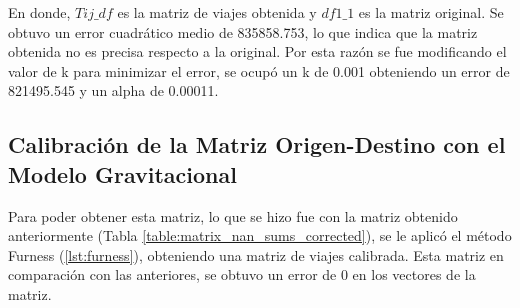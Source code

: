 \documentclass[letterpaper,12pt]{article}
\begin{document}
En donde, $Tij\_df$ es la matriz de viajes obtenida y $df1\_1$ es la matriz original. Se obtuvo un error cuadrático medio de 835858.753, lo que indica que la matriz obtenida no es precisa respecto a la original. Por esta razón se fue modificando el valor de k para minimizar el error, se ocupó un k de 0.001 obteniendo un error de 821495.545 y un alpha de 0.00011. 

\subsection{Calibración de la Matriz Origen-Destino con el Modelo Gravitacional}

Para poder obtener esta matriz, lo que se hizo fue con la matriz obtenido anteriormente (Tabla \ref{table:matrix_nan_sums_corrected}), se le aplicó el método Furness (\ref{lst:furness}), obteniendo una matriz de viajes calibrada. Esta matriz en comparación con las anteriores, se obtuvo un error de 0 en los vectores de la matriz.
\end{document}
